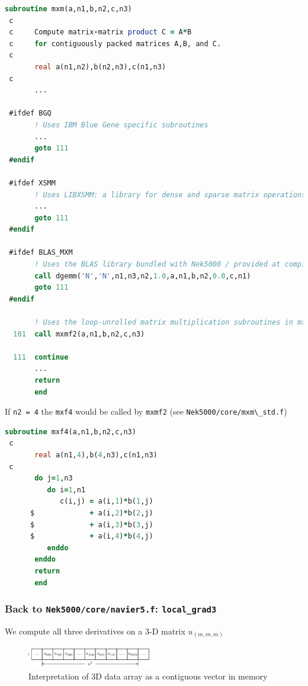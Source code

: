\documentclass[
  a4paper,
  10pt]{article}
\newcommand{\passthrough}[1]{#1}
\begin{document}
\begin{lstlisting}[language=Fortran]
       subroutine mxm(a,n1,b,n2,c,n3)
 c
 c     Compute matrix-matrix product C = A*B
 c     for contiguously packed matrices A,B, and C.
 c
       real a(n1,n2),b(n2,n3),c(n1,n3)
 c
       ...
 
 #ifdef BGQ
       ! Uses IBM Blue Gene specific subroutines
       ...
       goto 111
 #endif
 
 #ifdef XSMM
       ! Uses LIBXSMM: a library for dense and sparse matrix operations
       ...
       goto 111
 #endif
 
 #ifdef BLAS_MXM
       ! Uses the BLAS library bundled with Nek5000 / provided at compile-time
       call dgemm('N','N',n1,n3,n2,1.0,a,n1,b,n2,0.0,c,n1)
       goto 111
 #endif
 
       ! Uses the loop-unrolled matrix multiplication subroutines in mxm_std.f
  101  call mxmf2(a,n1,b,n2,c,n3)
 
  111  continue
       ...
       return
       end
\end{lstlisting}

If \passthrough{\lstinline!n2 = 4!} the \passthrough{\lstinline!mxf4!}
would be called by \passthrough{\lstinline!mxmf2!} (see
\passthrough{\lstinline!Nek5000/core/mxm\_std.f!})

\begin{lstlisting}[language=Fortran]
       subroutine mxf4(a,n1,b,n2,c,n3)
 c
       real a(n1,4),b(4,n3),c(n1,n3)
 c
       do j=1,n3
          do i=1,n1
             c(i,j) = a(i,1)*b(1,j)
      $             + a(i,2)*b(2,j)
      $             + a(i,3)*b(3,j)
      $             + a(i,4)*b(4,j)
          enddo
       enddo
       return
       end
\end{lstlisting}

\hypertarget{back-to-nek5000corenavier5.f-local_grad3}{%
\subsubsection{\texorpdfstring{Back to \texttt{Nek5000/core/navier5.f}:
\texttt{local\_grad3}}{Back to Nek5000/core/navier5.f: local\_grad3}}\label{back-to-nek5000corenavier5.f-local_grad3}}

We compute all three derivatives on a 3-D matrix \(u_{(m,m,m)}\)

\begin{figure}
\centering
\includegraphics[width=0.5\textwidth,height=\textheight]{figs/8d711f2db9c30e0864b2038788e4e8c30648ad26.png}
\caption{Interpretation of 3D data array as a contiguous vector in
memory}
\end{figure}
\end{document}
